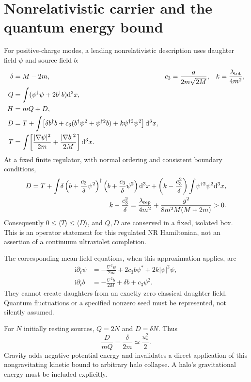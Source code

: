 \documentclass[11pt]{article}
\newcommand{\dd}{\mathrm{d}}
\newcommand{\ii}{\mathrm{i}}
\begin{document}
\section{Nonrelativistic carrier and the quantum energy bound}
For positive-charge modes, a leading nonrelativistic description uses daughter field $\psi$ and source field $b$:
\begin{align}
 \delta&=M-2m,&c_3&=\frac{g}{2m\sqrt{2M}},&k&=\frac{\lambda_{\rm tot}}{4m^2},\\
 Q&=\int(\psi^\dagger\psi+2b^\dagger b)\dd^3x,\\
 H&=mQ+D,\\
 D&=T+\int\!\left[\delta b^\dagger b+c_3(b^\dagger\psi^2+\psi^{\dagger2}b)
                  +k\psi^{\dagger2}\psi^2\right]\dd^3x,\\
 T&=\int\!\left[\frac{|\nabla\psi|^2}{2m}+\frac{|\nabla b|^2}{2M}\right]\dd^3x.
\end{align}
At a fixed finite regulator, with normal ordering and consistent boundary conditions,
\begin{align}
 D=T+\int\!\delta\left(b+\frac{c_3}{\delta}\psi^2\right)^\dagger
                  \left(b+\frac{c_3}{\delta}\psi^2\right)\dd^3x
   +\left(k-\frac{c_3^2}{\delta}\right)\int\!\psi^{\dagger2}\psi^2\dd^3x,\\
 k-\frac{c_3^2}{\delta}
 =\frac{\lambda_{\rm rep}}{4m^2}+\frac{g^2}{8m^2M(M+2m)}>0.
\end{align}
Consequently $0\le\langle T\rangle\le\langle D\rangle$, and $Q,D$ are conserved in a fixed, isolated box. This is an operator statement for this regulated NR Hamiltonian, not an assertion of a continuum ultraviolet completion.

The corresponding mean-field equations, when this approximation applies, are
\begin{align}
 \ii\partial_t\psi&=-\frac{\nabla^2\psi}{2m}+2c_3b\psi^*+2k|\psi|^2\psi,\\
 \ii\partial_t b&=-\frac{\nabla^2b}{2M}+\delta b+c_3\psi^2.
\end{align}
They cannot create daughters from an exactly zero classical daughter field. Quantum fluctuations or a specified nonzero seed must be represented, not silently assumed.

For $N$ initially resting sources, $Q=2N$ and $D=\delta N$. Thus
\begin{equation}
 \frac{D}{mQ}=\frac{\delta}{2m}\simeq\frac{u_*^2}{2}.
\end{equation}
Gravity adds negative potential energy and invalidates a direct application of this nongravitating kinetic bound to arbitrary halo collapse. A halo's gravitational energy must be included explicitly.
\end{document}

